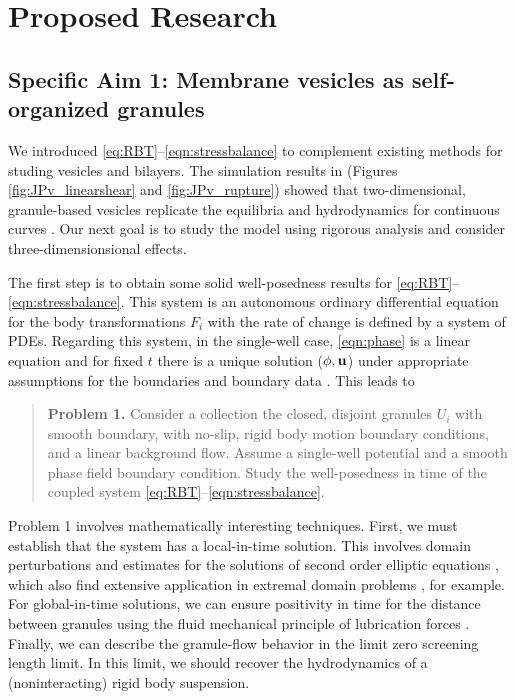 \section{Proposed Research}
\label{sec:proposed-work}

\subsection{Specific Aim 1: Membrane vesicles as self-organized granules}
\label{sec:specificaim1}
We introduced \eqref{eq:RBT}--\eqref{eqn:stressbalance} to complement
existing methods for studing vesicles and bilayers. 
The simulation results in 
(Figures \ref{fig:JPv_linearshear} and \ref{fig:JPv_rupture})
showed that two-dimensional, granule-based vesicles replicate the 
equilibria and hydrodynamics for continuous curves
\cite{FuQuRyYo22, Fu2018_SIAM}.
Our next goal is to study the model using rigorous analysis
and consider three-dimensionsional effects. 

The first step is to obtain some solid well-posedness results
for \eqref{eq:RBT}--\eqref{eqn:stressbalance}.
This system is an autonomous ordinary differential equation for
the body transformations $F_i$
with the rate of change is defined by a system of PDEs.
Regarding this system, in the single-well case,
\eqref{eqn:phase} is a linear equation
and for fixed $t$ there is a unique solution
($\phi, \mathbf{u}$) under appropriate
assumptions for the boundaries and boundary data
\cite{manasthesis,rac-gre2016,LAX}.
This leads to 
\begin{quotation}
  \textbf{Problem 1.} 
  Consider a collection the closed, disjoint granules
  $U_i$ with smooth boundary, with no-slip, rigid body
  motion boundary conditions, and a linear background flow.
  Assume a single-well potential and a smooth phase field
  boundary condition.  Study the well-posedness in
  time of the coupled system \eqref{eq:RBT}--\eqref{eqn:stressbalance}.
\end{quotation}
Problem 1 involves mathematically interesting techniques.
First, we must establish that the system has a local-in-time solution.
This involves domain perturbations and estimates for the
solutions of second order elliptic equations
\cite{Savar2002DomainPA, DANERS20081, Lamboley2015EstimatesOF},
which also find extensive application in extremal domain problems
\cite{Schiffer1954VariationOD, Henrot2006ExtremumPF,
  bogosel:hal-03607776,Bogosel2022OnTP}, for example.
For global-in-time solutions,
we can ensure positivity in time for the distance between granules
using the fluid mechanical principle of
lubrication forces \cite{cawthorn_balmforth_2010, leal_2007}.
Finally, we can describe the granule-flow
behavior in the limit zero screening length limit.
In this limit, we should recover the hydrodynamics of
a (noninteracting) rigid body suspension. 


